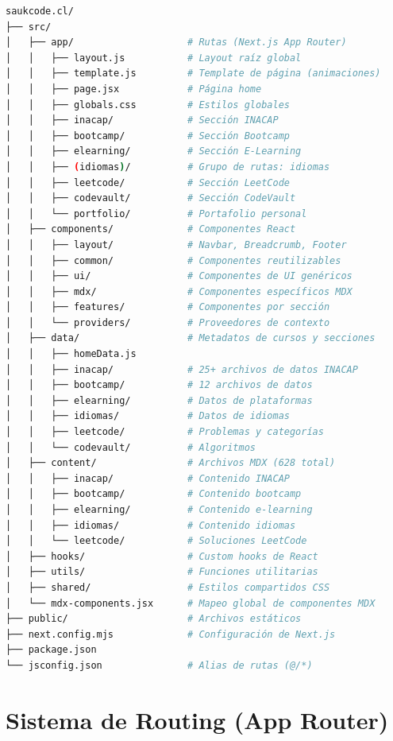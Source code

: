 \documentclass[12pt,a4paper]{article}
\begin{document}
\begin{lstlisting}[language=bash, caption={Árbol de directorios principal}]
saukcode.cl/
├── src/
│   ├── app/                    # Rutas (Next.js App Router)
│   │   ├── layout.js           # Layout raíz global
│   │   ├── template.js         # Template de página (animaciones)
│   │   ├── page.jsx            # Página home
│   │   ├── globals.css         # Estilos globales
│   │   ├── inacap/             # Sección INACAP
│   │   ├── bootcamp/           # Sección Bootcamp
│   │   ├── elearning/          # Sección E-Learning
│   │   ├── (idiomas)/          # Grupo de rutas: idiomas
│   │   ├── leetcode/           # Sección LeetCode
│   │   ├── codevault/          # Sección CodeVault
│   │   └── portfolio/          # Portafolio personal
│   ├── components/             # Componentes React
│   │   ├── layout/             # Navbar, Breadcrumb, Footer
│   │   ├── common/             # Componentes reutilizables
│   │   ├── ui/                 # Componentes de UI genéricos
│   │   ├── mdx/                # Componentes específicos MDX
│   │   ├── features/           # Componentes por sección
│   │   └── providers/          # Proveedores de contexto
│   ├── data/                   # Metadatos de cursos y secciones
│   │   ├── homeData.js
│   │   ├── inacap/             # 25+ archivos de datos INACAP
│   │   ├── bootcamp/           # 12 archivos de datos
│   │   ├── elearning/          # Datos de plataformas
│   │   ├── idiomas/            # Datos de idiomas
│   │   ├── leetcode/           # Problemas y categorías
│   │   └── codevault/          # Algoritmos
│   ├── content/                # Archivos MDX (628 total)
│   │   ├── inacap/             # Contenido INACAP
│   │   ├── bootcamp/           # Contenido bootcamp
│   │   ├── elearning/          # Contenido e-learning
│   │   ├── idiomas/            # Contenido idiomas
│   │   └── leetcode/           # Soluciones LeetCode
│   ├── hooks/                  # Custom hooks de React
│   ├── utils/                  # Funciones utilitarias
│   ├── shared/                 # Estilos compartidos CSS
│   └── mdx-components.jsx      # Mapeo global de componentes MDX
├── public/                     # Archivos estáticos
├── next.config.mjs             # Configuración de Next.js
├── package.json
└── jsconfig.json               # Alias de rutas (@/*)
\end{lstlisting}

\section{Sistema de Routing (App Router)}
\end{document}
